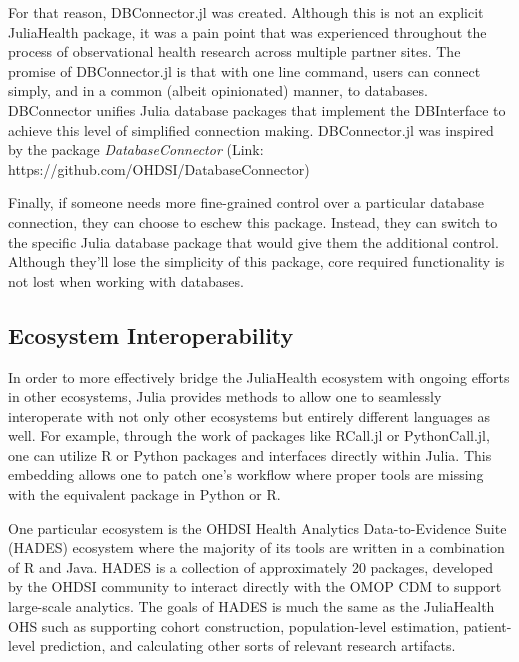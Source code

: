 \documentclass{juliacon}
\begin{document}
For that reason, DBConnector.jl was created.
Although this is not an explicit JuliaHealth package, it was a pain point that was experienced throughout the process of observational health research across multiple partner sites.
The promise of DBConnector.jl is that with one line command, users can connect simply, and in a common (albeit opinionated) manner, to databases.
DBConnector unifies Julia database packages that implement the DBInterface to achieve this level of simplified connection making.
DBConnector.jl was inspired by the package \textit{DatabaseConnector} (Link: https://github.com/OHDSI/DatabaseConnector)

Finally, if someone needs more fine-grained control over a particular database connection, they can choose to eschew this package.
Instead, they can switch to the specific Julia database package that would give them the additional control.
Although they'll lose the simplicity of this package, core required functionality is not lost when working with databases.

\subsection{Ecosystem Interoperability}

In order to more effectively bridge the JuliaHealth ecosystem with ongoing efforts in other ecosystems, Julia provides methods to allow one to seamlessly interoperate with not only other ecosystems but entirely different languages as well.
For example, through the work of packages like RCall.jl or PythonCall.jl, one can utilize R or Python packages and interfaces directly within Julia. \cite{PythonCall.jl} \cite{RCallJl}
This embedding allows one to patch one's workflow where proper tools are missing with the equivalent package in Python or R.

One particular ecosystem is the OHDSI Health Analytics Data-to-Evidence Suite (HADES) ecosystem where the majority of its tools are written in a combination of R and Java.
HADES is a collection of approximately 20 packages, developed by the OHDSI community to interact directly with the OMOP CDM to support large-scale analytics.
The goals of HADES is much the same as the JuliaHealth OHS such as supporting cohort construction, population-level estimation, patient-level prediction, and calculating other sorts of relevant research artifacts.
\end{document}
